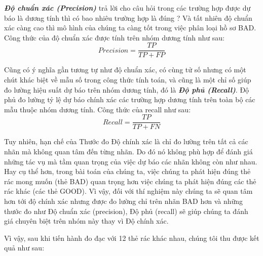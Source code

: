 \textbf{\textit{Độ chuẩn xác (Precision)}} trả lời cho câu hỏi trong các trường hợp được dự báo là dương tính thì có bao nhiêu trường hợp là đúng ? Và tất nhiên độ chuẩn xác càng cao thì mô hình của chúng ta càng tốt trong việc phân loại hồ sơ BAD. Công thức của độ chuẩn xác được tính trên nhóm dương tính như sau:
\begin{equation}
    Precision = \frac{TP}{TP + FP}
\end{equation}

Cũng có ý nghĩa gần tương tự như độ chuẩn xác, có cùng tử số nhưng có một chút khác biệt về mẫu số trong công thức tính toán, và cũng là một chỉ số giúp đo lường hiệu suất dự báo trên nhóm dương tính, đó là \textbf{\textit{Độ phủ (Recall)}}. 
Độ phủ đo lường tỷ lệ dự báo chính xác các trường hợp dương tính trên toàn bộ các mẫu thuộc nhóm dương tính. Công thức của recall như sau:
\begin{equation}
    Recall = \frac{TP}{TP + FN}
\end{equation}

Tuy nhiên, hạn chế của Thước đo Độ chính xác là chỉ đo lường trên tất cả các nhãn mà không quan tâm đến từng nhãn. Do đó nó không phù hợp để đánh giá những tác vụ mà tầm quan trọng của việc dự báo các nhãn không còn như nhau. Hay cụ thể hơn, trong bài toán của chúng ta, việc chúng ta phát hiện đúng thẻ rác mong muốn (thẻ BAD) quan trọng hơn việc chúng ta phát hiện đúng các thẻ rác khác (các thẻ GOOD). Vì vậy, đối với thí nghiệm này chúng ta sẽ quan tâm hơn tới độ chính xác nhưng được đo lường chỉ trên nhãn BAD hơn và những thước đo như Độ chuẩn xác (precision), Độ phủ (recall) sẽ giúp chúng ta đánh giá chuyên biệt trên nhóm này thay vì Độ chính xác. 

Vì vậy, sau khi tiến hành đo đạc với 12 thẻ rác khác nhau, chúng tôi thu được kết quả như sau:




